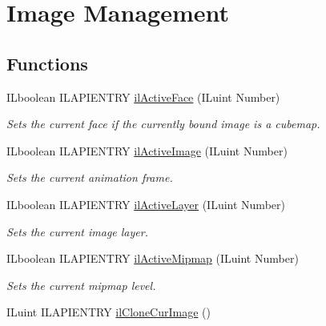 \hypertarget{group__image__mgt}{\section{Image Management}
\label{group__image__mgt}
}
\subsection*{Functions}
\begin{DoxyCompactItemize}
\item 
I\+Lboolean I\+L\+A\+P\+I\+E\+N\+T\+R\+Y \hyperlink{group__image__mgt_ga77651f86dfb248dddfead0c095ed2c12}{il\+Active\+Face} (I\+Luint Number)
\begin{DoxyCompactList}\small\item\em Sets the current face if the currently bound image is a cubemap. \end{DoxyCompactList}\item 
I\+Lboolean I\+L\+A\+P\+I\+E\+N\+T\+R\+Y \hyperlink{group__image__mgt_ga1ea5b35280be4128de20e7218108d669}{il\+Active\+Image} (I\+Luint Number)
\begin{DoxyCompactList}\small\item\em Sets the current animation frame. \end{DoxyCompactList}\item 
I\+Lboolean I\+L\+A\+P\+I\+E\+N\+T\+R\+Y \hyperlink{group__image__mgt_gad362b9264fd40f787f2748237b214f96}{il\+Active\+Layer} (I\+Luint Number)
\begin{DoxyCompactList}\small\item\em Sets the current image layer. \end{DoxyCompactList}\item 
I\+Lboolean I\+L\+A\+P\+I\+E\+N\+T\+R\+Y \hyperlink{group__image__mgt_ga02171eee15fcaf5fb1d1741307e7f8bc}{il\+Active\+Mipmap} (I\+Luint Number)
\begin{DoxyCompactList}\small\item\em Sets the current mipmap level. \end{DoxyCompactList}\item 
\hypertarget{group__image__mgt_gae0771d03e54685b692b1103a1b29f80c}{I\+Luint I\+L\+A\+P\+I\+E\+N\+T\+R\+Y \hyperlink{group__image__mgt_gae0771d03e54685b692b1103a1b29f80c}{il\+Clone\+Cur\+Image} ()}\label{group__image__mgt_gae0771d03e54685b692b1103a1b29f80c}


\end{DoxyCompactItemize}
